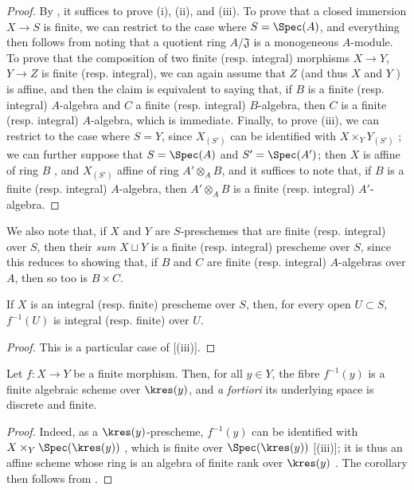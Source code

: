 \begin{proof}
By , it suffices to prove (i), (ii), and (iii).
To prove that a closed immersion $X\to S$ is finite, we can restrict to the case where $S=\Spec(A)$, and everything then follows from noting that a quotient ring $A/\mathfrak{J}$ is a monogeneous $A$-module.
To prove that the composition of two finite (resp. integral) morphisms $X\to Y$, $Y\to Z$ is finite (resp. integral), we can again assume that $Z$ (and thus $X$ and $Y$ ) is affine, and then the claim is equivalent to saying that, if $B$ is a finite (resp. integral) $A$-algebra and $C$ a finite (resp. integral) $B$-algebra, then $C$ is a finite (resp. integral) $A$-algebra, which is immediate.
Finally, to prove (iii), we can restrict to the case where $S=Y$, since $X_{(S')}$ can be identified with $X\times_Y Y_{(S')}$ ;
we can further suppose that $S=\Spec(A)$ and $S'=\Spec(A')$;
then $X$ is affine of ring $B$ , and $X_{(S')}$ affine of ring $A'\otimes_A B$, and it suffices to note that, if $B$ is a finite (resp. integral) $A$-algebra, then $A'\otimes_A B$ is a finite (resp. integral) $A'$-algebra.
\end{proof}

We also note that, if $X$ and $Y$ are $S$-preschemes that are finite (resp. integral) over $S$, then their \emph{sum} $X\sqcup Y$ is a finite (resp. integral) prescheme over $S$, since this reduces to showing that, if $B$ and $C$ are finite (resp. integral) $A$-algebras over $A$, then so too is $B\times C$.

\begin{corollary}[6.1.6]
\label{II.6.1.6}
If $X$ is an integral (resp. finite) prescheme over $S$, then, for every open $U\subset S$, $f^{-1}(U)$ is integral (resp. finite) over $U$.
\end{corollary}

\begin{proof}
This is a particular case of [(iii)].
\end{proof}

\begin{corollary}[6.1.7]
\label{II.6.1.7}
Let $f:X\to Y$ be a finite morphism.
Then, for all $y\in Y$, the fibre $f^{-1}(y)$ is a finite algebraic scheme over $\kres(y)$, and \emph{a fortiori} its underlying space is discrete and finite.
\end{corollary}

\begin{proof}
Indeed, as a $\kres(y)$-prescheme, $f^{-1}(y)$ can be identified with $X\times_Y\Spec(\kres(y))$ , which is finite over $\Spec(\kres(y))$ [(iii)];
it is thus an affine scheme whose ring is an algebra of finite rank over $\kres(y)$ .
The corollary then follows from .
\end{proof}

